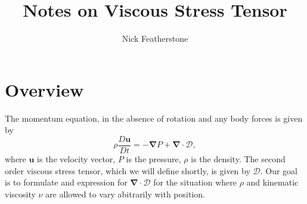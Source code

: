 \documentclass[10pt, letterpaper]{article}
\begin{document}

{
\renewcommand{\familydefault}{\sfdefault}


\renewcommand{\abstractname}{Overview}


\title{Notes on Viscous Stress Tensor}
\author{Nick Featherstone}
\date{}
\maketitle

\newcommand{\uvec}{\boldsymbol{u}}
\newcommand{\vgrad}{\boldsymbol{\nabla}}
\newcommand{\Dscript}{\boldsymbol{\mathcal{D}}}
\newcommand{\ebold}{\boldsymbol{e}}
\newcommand{\etwiddle}{\boldsymbol{\tilde{e}}}
\newcommand{\etwid}{\tilde{e}}
\newcommand{\sintheta}{\mathrm{sin}\theta}
\newcommand{\cottheta}{\mathrm{cot}\theta}
\newcommand{\dvec}{\boldsymbol{d}}
\newcommand{\bvec}{\boldsymbol{b}}
\newcommand{\mvec}{\boldsymbol{m}}
\newcommand{\divu}{\vgrad\cdot\uvec}
\newcommand{\half}{\frac{1}{2}}
\newcommand{\third}{\frac{1}{3}}
\section{Overview}
The momentum equation, in the absence of rotation and any body forces is given by
\begin{equation}
\label{eq:momentum1}
\rho\frac{D\uvec}{Dt} = -\vgrad P +\vgrad\cdot\Dscript,
\end{equation}
where $\uvec$ is the velocity vector, $P$ is the pressure, $\rho$ is the density.  The second order viscous stress tensor, which we will define shortly, is given by $\Dscript$.   Our goal is to formulate and expression for $\vgrad\cdot\Dscript$ for the situation where $\rho$ and kinematic viscosity $\nu$ are allowed to vary abitrarily with position.

}
\end{document}
